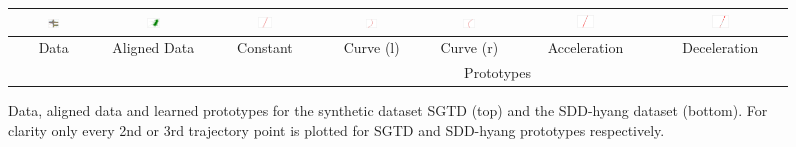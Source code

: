 \documentclass[letterpaper, 10 pt, conference]{ieeeconf}  %
\begin{document}
\begin{figure}[t!]
\begin{center}
\begin{tabular}{cc|ccccc}
			\includegraphics[width=0.139\textwidth]{hyang_data.png} &
			\includegraphics[width=0.139\textwidth]{hyang_alignment.png} &	
			\includegraphics[width=0.139\textwidth]{hyang_fat_proto_00_every-3.png} &
			\includegraphics[width=0.139\textwidth]{hyang_fat_proto_04_every-3.png} &
			\includegraphics[width=0.139\textwidth]{hyang_fat_proto_05_every-3.png} &
			\includegraphics[width=0.139\textwidth]{hyang_fat_proto_06_every-3.png} &
			\includegraphics[width=0.139\textwidth]{hyang_fat_proto_02_every-3.png}	\\
			\hline
			
			\small Data & \small Aligned Data & \small \small Constant & \small Curve (l) & \small Curve (r) & \small Acceleration & \small Deceleration \\
			&& \multicolumn{5}{c}{\small Prototypes}
		\end{tabular}
	\end{center}
	\caption{Data, aligned data and learned prototypes for the synthetic dataset SGTD (top) and the SDD-hyang dataset (bottom).
	For clarity only every 2nd or 3rd trajectory point is plotted for SGTD and SDD-hyang prototypes respectively.}
	\label{fig:results}
\end{figure}
\end{document}
